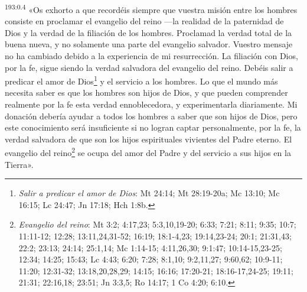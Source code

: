 \par 
\textsuperscript{193:0.4} «Os exhorto a que recordéis siempre que vuestra misión entre los hombres consiste en proclamar el evangelio del reino ---la realidad de la paternidad de Dios y la verdad de la filiación de los hombres. Proclamad la verdad total de la buena nueva, y no solamente una parte del evangelio salvador. Vuestro mensaje no ha cambiado debido a la experiencia de mi resurrección. La filiación con Dios, por la fe, sigue siendo la verdad salvadora del evangelio del reino. Debéis salir a predicar el amor de Dios\footnote{\textit{Salir a predicar el amor de Dios}: Mt 24:14; Mt 28:19-20a; Mc 13:10; Mc 16:15; Lc 24:47; Jn 17:18; Hch 1:8b.} y el servicio a los hombres. Lo que el mundo más necesita saber es que los hombres son hijos de Dios, y que pueden comprender realmente por la fe esta verdad ennoblecedora, y experimentarla diariamente. Mi donación debería ayudar a todos los hombres a saber que son hijos de Dios, pero este conocimiento será insuficiente si no logran captar personalmente, por la fe, la verdad salvadora de que son los hijos espirituales vivientes del Padre eterno. El evangelio del reino\footnote{\textit{Evangelio del reino}: Mt 3:2; 4:17,23; 5:3,10,19-20; 6:33; 7:21; 8:11; 9:35; 10:7; 11:11-12; 12:28; 13:11,24,31-52; 16:19; 18:1-4,23; 19:14,23-24; 20:1; 21:31,43; 22:2; 23:13; 24:14; 25:1,14; Mc 1:14-15; 4:11,26,30; 9:1:47; 10:14-15,23-25; 12:34; 14:25; 15:43; Lc 4:43; 6:20; 7:28; 8:1,10; 9:2,11,27; 9:60,62; 10:9-11; 11:20; 12:31-32; 13:18,20,28,29; 14:15; 16:16; 17:20-21; 18:16-17,24-25; 19:11; 21:31; 22:16,18; 23:51; Jn 3:3,5; Ro 14:17; 1 Co 4:20; 6:10.} se ocupa del amor del Padre y del servicio a sus hijos en la Tierra».

